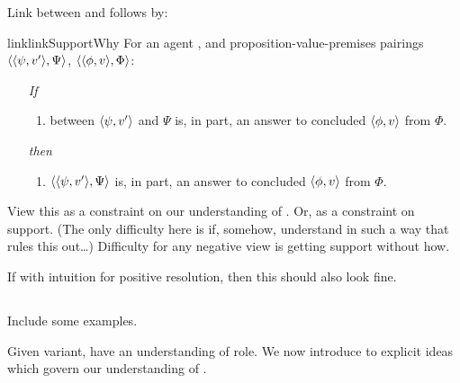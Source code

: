 \begin{note}
  Link between \qWhy{} and \qWhyV{} follows by:

  \begin{restatable}{link}{linkSupportWhy}
    \label{link:why:support:pvpp}
    For an agent \vAgent{}, and proposition-value-premises pairings \(\langle \langle \psi, v' \rangle, \Psi \rangle\), \(\langle \langle \phi, v \rangle, \Phi \rangle\):

    \begin{itemize}
    \item[\emph{If}]
      \begin{enumerate}[label=\alph*., ref=(\alph*)]
      \item
         between \(\langle \psi, v' \rangle\) and \(\Psi\) is, in part, an answer to \qWhyV{} \vAgent{} concluded \(\langle \phi, v \rangle\) from \(\Phi\).
      \end{enumerate}
    \item[\emph{then}]
      \begin{enumerate}[label=\alph*., ref=(\alph*), resume]
      \item
        \(\langle \langle \psi, v' \rangle, \Psi \rangle\) is, in part, an answer to \qWhy{} \vAgent{} concluded \(\langle \phi, v \rangle\) from \(\Phi\).
      \end{enumerate}
    \end{itemize}
    \vspace{-\baselineskip}
  \end{restatable}
  {
    \color{red}
    View this as a constraint on our understanding of \qWhy{}.
    Or, as a constraint on support.
    (The only difficulty here is if, somehow, understand \qWhy{} in such a way that rules this out\dots)
  }
  Difficulty for any negative view is getting support without how.

  If with intuition for positive resolution, then this should also look fine.
\end{note}

\subsection{}
\label{sec:support2}

{
  \color{red} Include some examples.
}

\begin{note}
  Given variant, have an understanding of role.
  We now introduce to explicit ideas which govern our understanding of \support{}.
\end{note}


